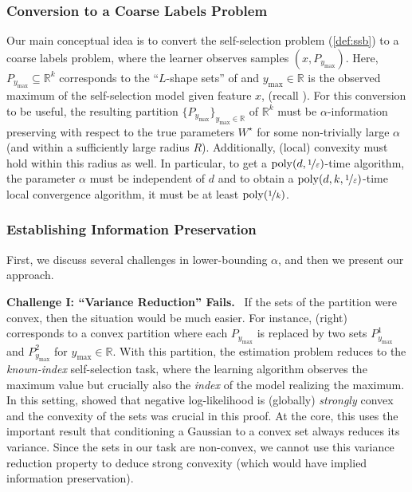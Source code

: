 \documentclass[11pt,letterpaper]{article}
\makeatletter
\theoremstyle{plain}
\theoremstyle{definition}
\theoremstyle{remark}
\renewcommand{\eqref}[1]{\textup{\eqrefform@{\ref{#1}}}}
\let\eqrefform@\tagform@
\newcommand{\R}{\mathbb{R}}
\newcommand{\nfrac}[2]{\nicefrac{#1}{#2}}
\newcommand{\poly}{\mathrm{poly}}
\newcommand{\eps}{\varepsilon}
\renewcommand{\paragraph}[1]{\medskip \noindent\textbf{#1}~}
\newcommand{\ymax}{y_{\max}}
\makeatother
\begin{document}
\subsubsection*{{Conversion to a Coarse Labels Problem}} 
    Our main conceptual idea is to convert the self-selection problem (\cref{def:ssb}) to a coarse labels problem, where the learner observes samples $(x,P_{\ymax})$.
    Here, $P_{\ymax} \subseteq\R^k$ corresponds to the ``$L$-shape sets'' of  and $\ymax \in \R$ is the observed maximum of the self-selection model given feature $x$, (recall \eqref{eq:L-shapeSets}). 
    For this conversion to be useful, the resulting partition $\{P_{\ymax}\}_{\ymax \in \R}$ of $\R^k$ must be $\alpha$-information preserving with respect to the true parameters $W^\star$ for some non-trivially large $\alpha$ (and within {a} sufficiently large radius {$R$}). Additionally, {(local) convexity must hold within this radius as well}.
    In particular, to get a $\poly(d,\nfrac{1}{\eps})$-time algorithm, the parameter $\alpha$ must be independent of $d$ and to obtain a $\poly(d,k,\nfrac{1}{\eps})$-time local convergence algorithm, {it} must be at least $\poly(\nfrac{1}{k})$.

    \subsubsection*{Establishing Information Preservation} 
    \smallskip 

         \noindent First, we discuss several challenges in lower-bounding $\alpha$, and then we present our approach. %
    
    
    \paragraph{{Challenge I: ``Variance Reduction'' Fails.}} 
            If the sets of the partition were convex, then the situation would be much easier. 
            For instance,  (right) corresponds to a convex partition where each 
            $P_{\ymax}$ is replaced by two sets $P_{\ymax}^1$ and $P_{\ymax}^2$ for $\ymax\in \R$. 
            {With this partition, the estimation} problem reduces to the \emph{known-index} self-selection task, where the learning algorithm observes the maximum value but {crucially} also the \textit{index} of the model realizing {the maximum}. 
            In this setting, \cite{cherapanamjeri2023selfselection} showed that negative log-likelihood is {{(globally)} \textit{strongly}} convex and the convexity of the sets was crucial in this proof. 
            At the core, this uses the important result that conditioning a Gaussian to a convex set always reduces its variance.
            Since the sets in our task are non-convex, we cannot use this variance reduction property to deduce strong convexity (which would have implied information preservation). 
        
\end{document}
